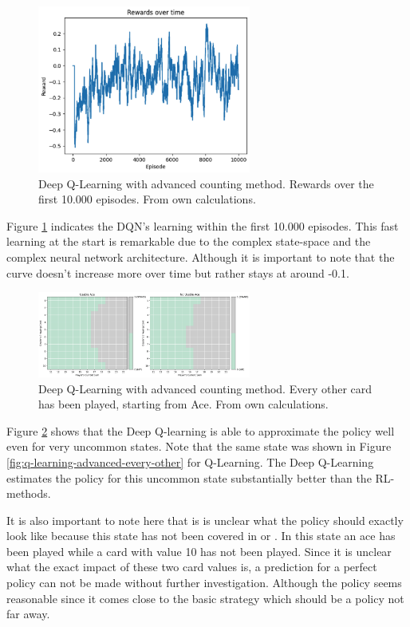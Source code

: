 \documentclass[conference]{IEEEtran}
\begin{document}
\begin{figure}
	\centering
	\includegraphics[width=70mm]{figures/DQN/rewards_over_time_10000.png}
	\caption{Deep Q-Learning with advanced counting method. Rewards over the first 10.000 episodes. From own calculations.}
	\label{fig:dqn-rewards-over-time}
\end{figure}

Figure \ref{fig:dqn-rewards-over-time} indicates the DQN's learning within the first 10.000 episodes. 
This fast learning at the start is remarkable due to the complex state-space and the complex neural network architecture. 
Although it is important to note that the curve doesn't increase more over time but rather stays at around -0.1. 

\begin{figure}
	\centering
	\includegraphics[width=70mm]{figures/DQN/advanced/policy-1010101010.png}
	\caption{Deep Q-Learning with advanced counting method. Every other card has been played, starting from Ace. From own calculations.}
	\label{fig:dqn-advanced-every-other}
\end{figure}

Figure \ref{fig:dqn-advanced-every-other} shows that the Deep Q-learning is able to approximate the policy well even for very uncommon states. 
Note that the same state was shown in Figure \ref{fig:q-learning-advanced-every-other} for Q-Learning. 
The Deep Q-Learning estimates the policy for this uncommon state substantially better than the RL-methods. 

It is also important to note here that is is unclear what the policy should exactly look like because this state has not been covered in \cite{b1} or \cite{b4}.
In this state an ace has been played while a card with value 10 has not been played. 
Since it is unclear what the exact impact of these two card values is, a prediction for a perfect policy can not be made without further investigation. 
Although the policy seems reasonable since it comes close to the basic strategy \cite{b1} which should be a policy not far away.
\end{document}

